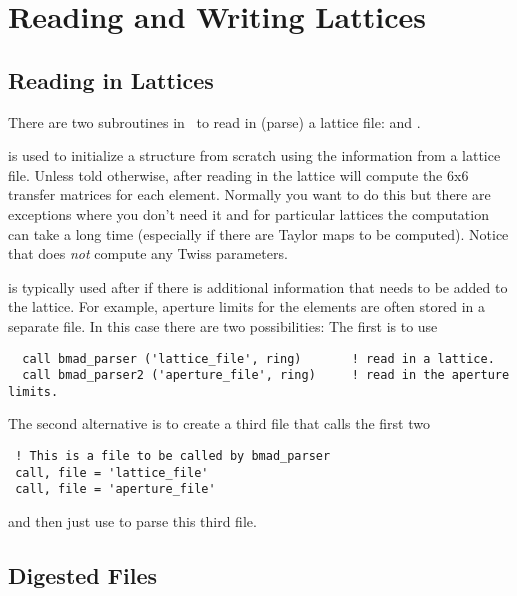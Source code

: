 \chapter{Reading and Writing Lattices}

\section{Reading in Lattices}

There are two subroutines in \bmad\ to read in (parse) a lattice
file:  and .

 is used to initialize a 
structure from scratch using the information from a lattice
file. Unless told otherwise, after reading in the lattice
 will compute the 6x6 transfer matrices for each
element. Normally you want to do this but there are exceptions where
you don't need it and for particular lattices the computation can take
a long time (especially if there are Taylor maps to be
computed). Notice that  does {\em not} compute any
Twiss parameters.

 is typically used after  if there is
additional information that needs to be added to the lattice. For
example, aperture limits for the elements are often stored in a
separate file. In this case there are two possibilities: The first is
to use 
\begin{verbatim}
  call bmad_parser ('lattice_file', ring)       ! read in a lattice.
  call bmad_parser2 ('aperture_file', ring)     ! read in the aperture limits.
\end{verbatim}
The second alternative is to create a third file that calls the first two
\begin{verbatim}
 ! This is a file to be called by bmad_parser
 call, file = 'lattice_file'
 call, file = 'aperture_file'
\end{verbatim}
and then just use  to parse this third file.


\section{Digested Files}

